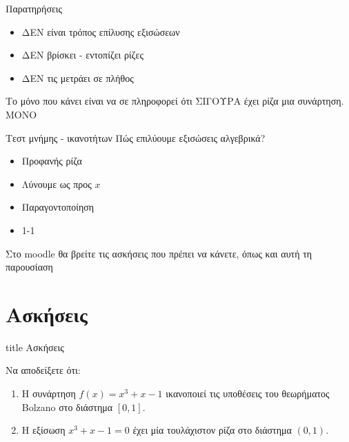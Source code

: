 \documentclass{presentation}
\begin{document}
\begin{frame}{Παρατηρήσεις}
  \begin{itemize}
    \item<1-> ΔΕΝ είναι τρόπος επίλυσης εξισώσεων
    \item<2-> ΔΕΝ βρίσκει - εντοπίζει ρίζες
    \item<3-> ΔΕΝ τις μετράει σε πλήθος
  \end{itemize}
  Το μόνο που κάνει είναι να σε πληροφορεί ότι ΣΙΓΟΥΡΑ έχει ρίζα μια συνάρτηση.  ΜΟΝΟ
\end{frame}

\begin{frame}{Τεστ μνήμης - ικανοτήτων}
  Πώς επιλύουμε εξισώσεις αλγεβρικά?
  \begin{itemize}
    \item<1-> Προφανής ρίζα
    \item<2-> Λύνουμε ως προς $x$
    \item<3-> Παραγοντοποίηση
    \item<4-> 1-1
  \end{itemize}
\end{frame}

\begin{frame}[noframenumbering]
  Στο moodle θα βρείτε τις ασκήσεις που πρέπει να κάνετε, όπως και αυτή τη παρουσίαση
\end{frame}

\section{Ασκήσεις}

\begin{frame}[noframenumbering]
  \vfill
  \centering
  \begin{beamercolorbox}[sep=8pt,center,shadow=true,rounded=true]{title}
    Ασκήσεις
  \end{beamercolorbox}
  \vfill
\end{frame}

\begin{askisi}
  Να αποδείξετε ότι:
  \begin{enumerate}
    \item<1-> Η συνάρτηση $f(x)=x^3+x-1$ ικανοποιεί τις υποθέσεις του θεωρήματος Bolzano στο διάστημα $[0,1]$.
    \item<2-> Η εξίσωση $x^3+x-1=0$ έχει μία τουλάχιστον ρίζα στο διάστημα $(0,1)$.
  \end{enumerate}

\end{askisi}
\end{document}
